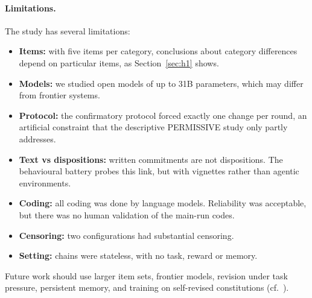 \paragraph{Limitations.}
The study has several limitations:
\begin{itemize}
\item \textbf{Items:} with five items per category, conclusions about category differences depend on particular items, as Section~\ref{sec:h1} shows.
\item \textbf{Models:} we studied open models of up to 31B parameters, which may differ from frontier systems.
\item \textbf{Protocol:} the confirmatory protocol forced exactly one change per round, an artificial constraint that the descriptive PERMISSIVE study only partly addresses.
\item \textbf{Text vs dispositions:} written commitments are not dispositions. The behavioural battery probes this link, but with vignettes rather than agentic environments.
\item \textbf{Coding:} all coding was done by language models. Reliability was acceptable, but there was no human validation of the main-run codes.
\item \textbf{Censoring:} two configurations had substantial censoring.
\item \textbf{Setting:} chains were stateless, with no task, reward or memory.
\end{itemize}

Future work should use larger item sets, frontier models, revision under task pressure, persistent memory, and training on self-revised constitutions (cf.\ \citealp{github_valuedrift}).
